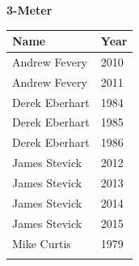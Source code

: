 \vspace{1.2em}
\noindent\begin{minipage}[t]{0.48\textwidth}
\centering
\textbf{\textcolor{teamprimary}{3-Meter}}\par
\vspace{0.5em}
\centering
\small
\renewcommand{\arraystretch}{1.0}
\setlength{\tabcolsep}{4pt}
\begin{tabular}{@{}p{3.0cm}p{1.0cm}@{}}
\toprule
\textbf{Name} & \textbf{Year} \\
\midrule
Andrew Fevery & 2010 \\
Andrew Fevery & 2011 \\
Derek Eberhart & 1984 \\
Derek Eberhart & 1985 \\
Derek Eberhart & 1986 \\
James Stevick & 2012 \\
James Stevick & 2013 \\
James Stevick & 2014 \\
James Stevick & 2015 \\
Mike Curtis & 1979 \\
\bottomrule
\vspace{0.5em}
\end{tabular}
\end{minipage}